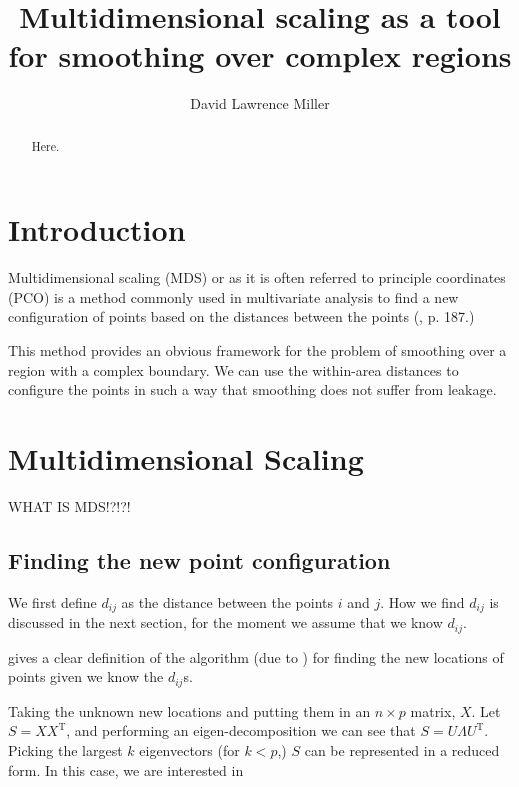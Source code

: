\documentclass[a4paper,10pt]{amsart}
\title{Multidimensional scaling as a tool for smoothing over complex regions}
\author{David Lawrence Miller}
\newcommand{\tr}[1]{#1^{\text{T}}}
\begin{document}
 
\begin{abstract}
Here.
\end{abstract}
 
 
\newtheorem{thm}{Theorem}[section]
 
\newtheorem{defn}{Definition}[section]
 
\maketitle


\section{Introduction}

Multidimensional scaling (MDS) or as it is often referred to principle coordinates (PCO) is a method commonly used in multivariate analysis to find a new configuration of points based on the distances between the points (\cite{chatfieldcollins}, p. 187.)

This method provides an obvious framework for the problem of smoothing over a region with a complex boundary. We can use the within-area distances to configure the points in such a way that smoothing does not suffer from leakage.

\section{Multidimensional Scaling}

WHAT IS MDS!?!?!

\subsection{Finding the new point configuration}

We first define $d_{ij}$ as the distance between the points $i$ and $j$. How we find $d_{ij}$ is discussed in the next section, for the moment we assume that we know $d_{ij}$.

\cite{diaconis08} gives a clear definition of the algorithm (due to \cite{schoenberg35}) for finding the new locations of points given we know the $d_{ij}$s. 

Taking the unknown new locations and putting them in an $n \times p$ matrix, $X$. Let $S=X\tr{X}$, and performing an eigen-decomposition we can see that $S=U\Lambda\tr{U}$. Picking the largest $k$ eigenvectors (for $k<p$,) $S$ can be represented in a reduced form. In this case, we are interested in
\end{document}
